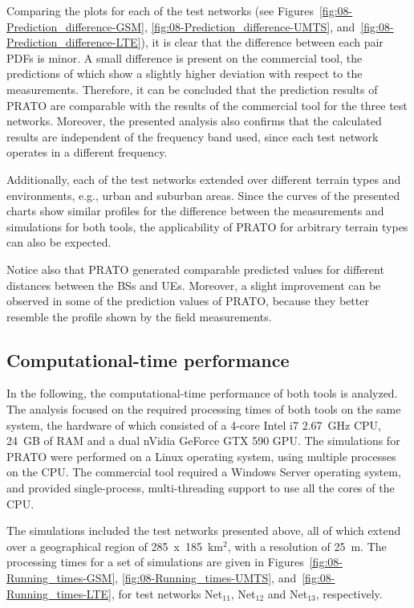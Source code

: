 Comparing the plots for each of the test networks (see Figures~\ref{fig:08-Prediction_difference-GSM},
\ref{fig:08-Prediction_difference-UMTS}, and~\ref{fig:08-Prediction_difference-LTE}),
it is clear that the difference between each pair PDFs is minor. A
small difference is present on the commercial tool, the predictions
of which show a slightly higher deviation with respect to the measurements.
Therefore, it can be concluded that the prediction results of PRATO
are comparable with the results of the commercial tool for the three
test networks. Moreover, the presented analysis also confirms that
the calculated results are independent of the frequency band used,
since each test network operates in a different frequency.

Additionally, each of the test networks extended over different terrain
types and environments, e.g., urban and suburban areas. Since the
curves of the presented charts show similar profiles for the difference
between the measurements and simulations for both tools, the applicability
of PRATO for arbitrary terrain types can also be expected.

Notice also that PRATO generated comparable predicted values for different
distances between the BSs and UEs. Moreover, a slight improvement
can be observed in some of the prediction values of PRATO, because
they better resemble the profile shown by the field measurements.


\subsection*{Computational-time performance}

In the following, the computational-time performance of both tools
is analyzed. The analysis focused on the required processing times
of both tools on the same system, the hardware of which consisted
of a 4-core Intel i7 2.67~GHz CPU, 24~GB of RAM and a dual nVidia
GeForce GTX 590 GPU. The simulations for PRATO were performed on a
Linux operating system, using multiple processes on the CPU. The commercial
tool required a Windows Server operating system, and provided single-process,
multi-threading support to use all the cores of the CPU.

The simulations included the test networks presented above, all of
which extend over a geographical region of 285~x~185~km$^{2}$,
with a resolution of 25~m. The processing times for a set of simulations
are given in Figures~\ref{fig:08-Running_times-GSM}, \ref{fig:08-Running_times-UMTS},
and~\ref{fig:08-Running_times-LTE}, for test networks Net$_{11}$,
Net$_{12}$ and Net$_{13}$, respectively.

